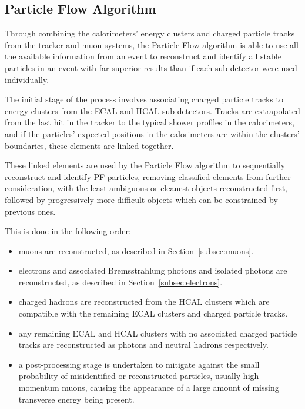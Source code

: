 \subsection{Particle Flow Algorithm}\label{subsec:PF}
Through combining the calorimeters' energy clusters and charged particle tracks from the tracker and muon systems, the Particle Flow algorithm is able to use all the available information from an event to reconstruct and identify all stable particles in an event with far superior results than if each sub-detector were used individually.

The initial stage of the process involves associating charged particle tracks to energy clusters from the ECAL and HCAL sub-detectors.
Tracks are extrapolated from the last hit in the tracker to the typical shower profiles in the calorimeters, and if the particles' expected positions in the calorimeters are within the clusters' boundaries, these elements are linked together.

These linked elements are used by the Particle Flow algorithm to sequentially reconstruct and identify PF particles, removing classified elements from further consideration, with the least ambiguous or cleanest objects reconstructed first, followed by progressively more difficult objects which can be constrained by previous ones.

This is done in the following order: 
\begin{itemize}
\item muons are reconstructed, as described in Section~\ref{subsec:muons}.
\item electrons and associated Bremsstrahlung photons and isolated photons are reconstructed, as described in Section~\ref{subsec:electrons}.
\item charged hadrons are reconstructed from the HCAL clusters which are compatible with the remaining ECAL clusters and charged particle tracks.
\item any remaining ECAL and HCAL clusters with no associated charged particle tracks are reconstructed as photons and neutral hadrons respectively.
\item a post-processing stage is undertaken to mitigate against the small probability of misidentified or reconstructed particles, usually high momentum muons, causing the appearance of a large amount of missing transverse energy being present.
\end{itemize}

